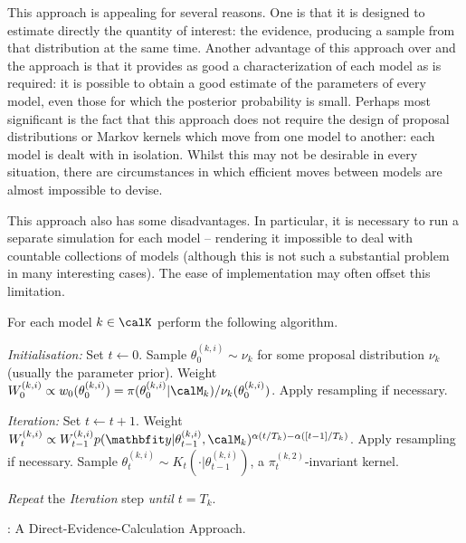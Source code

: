 This approach is appealing for several reasons. One is that it is designed to
estimate directly the quantity of interest: the evidence, producing a sample
from that distribution at the same time. Another advantage of this approach
over \smc[1] and the \rjmcmc approach is that it provides as good a
characterization of each model as is required: it is possible to obtain a good
estimate of the parameters of every model, even those for which the posterior
probability is small. Perhaps most significant is the fact that this approach
does not require the design of proposal distributions or Markov kernels which
move from one model to another: each model is dealt with in isolation. Whilst
this may not be desirable in every situation, there are circumstances in which
efficient moves between models are almost impossible to devise.

This approach also has some disadvantages. In particular, it is necessary to
run a separate simulation for each model -- rendering it impossible to deal
with countable collections of models (although this is not such a substantial
problem in many interesting cases). The ease of implementation may often
offset this limitation.

\begin{algorithm}
\begin{algorithmic}
  \tophrule
  \STATE For each model $k \in \calK$ perform the following algorithm.

  \STATE \emph{Initialisation:} Set $t\leftarrow0$.
  \STATE\STATESKIP Sample $\theta_0^{(k,i)}\sim\nu_k$ for some proposal
  distribution $\nu_k$ (usually the parameter prior).
  \STATE\STATESKIP Weight $W_0^{(k,i)} \propto w_0(\theta_0^{(k,i)}) =
  {\pi(\theta_0^{(k,i)}|\calM_k)}/{\nu_k(\theta_0^{(k,i)})}$.
  \STATE\STATESKIP Apply resampling if necessary.

  \STATE \emph{Iteration:} Set $t\leftarrow t + 1$.
  \STATE\STATESKIP Weight $W_t^{(k,i)} \propto W_{t-1}^{(k,i)}
  p(\data|\theta_{t-1}^{(k,i)},\calM_k)^{\alpha(t/T_k) - \alpha([t-1]/T_k)}$.
  \STATE\STATESKIP Apply resampling if necessary.
  \STATE\STATESKIP Sample $\theta_t^{(k,i)} \sim
  K_t(\cdot|\theta_{t-1}^{(k,i)})$, a $\pi_t^{(k,2)}$-invariant kernel.

  \STATE \emph{Repeat} the \emph{Iteration} step \emph{until $t = T_k$}.
  \bottomhrule
\end{algorithmic}
\caption{\smc[2]: A Direct-Evidence-Calculation Approach.}\label{alg:smc2}
\end{algorithm}

